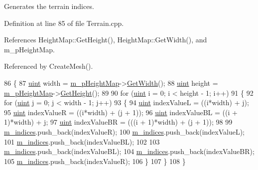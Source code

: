 Generates the terrain indices. 



Definition at line 85 of file Terrain.\+cpp.



References Height\+Map\+::\+Get\+Height(), Height\+Map\+::\+Get\+Width(), and m\+\_\+p\+Height\+Map.



Referenced by Create\+Mesh().


\begin{DoxyCode}
86 \{
87   \hyperlink{_types_8h_a4f5fce8c1ef282264f9214809524d836}{uint} width = \hyperlink{class_terrain_a1573c3a4a21afe306700bd00e7a9b4f5}{m\_pHeightMap}->\hyperlink{class_height_map_a85709e10bb08442730bfddb649a86e0b}{GetWidth}();
88   \hyperlink{_types_8h_a4f5fce8c1ef282264f9214809524d836}{uint} height = \hyperlink{class_terrain_a1573c3a4a21afe306700bd00e7a9b4f5}{m\_pHeightMap}->\hyperlink{class_height_map_a4c1243d24a8c5d039ea967a57a7bf462}{GetHeight}();
89 
90   \textcolor{keywordflow}{for} (\hyperlink{_types_8h_a4f5fce8c1ef282264f9214809524d836}{uint} i = 0; i < height - 1; i++)
91   \{
92     \textcolor{keywordflow}{for} (\hyperlink{_types_8h_a4f5fce8c1ef282264f9214809524d836}{uint} j = 0; j < width - 1; j++)
93     \{
94       \hyperlink{_types_8h_a4f5fce8c1ef282264f9214809524d836}{uint} indexValueL = ((i*width) + j);
95       \hyperlink{_types_8h_a4f5fce8c1ef282264f9214809524d836}{uint} indexValueR = ((i*width) + (j + 1));
96       \hyperlink{_types_8h_a4f5fce8c1ef282264f9214809524d836}{uint} indexValueBL = ((i + 1)*width) + j;
97       \hyperlink{_types_8h_a4f5fce8c1ef282264f9214809524d836}{uint} indexValueBR = (((i + 1)*width) + (j + 1));
98 
99       \hyperlink{class_terrain_a79132b320d28c77f4c7cb55b9f562631}{m\_indices}.push\_back(indexValueR);
100       \hyperlink{class_terrain_a79132b320d28c77f4c7cb55b9f562631}{m\_indices}.push\_back(indexValueL);
101       \hyperlink{class_terrain_a79132b320d28c77f4c7cb55b9f562631}{m\_indices}.push\_back(indexValueBL);
102 
103       \hyperlink{class_terrain_a79132b320d28c77f4c7cb55b9f562631}{m\_indices}.push\_back(indexValueBL);
104       \hyperlink{class_terrain_a79132b320d28c77f4c7cb55b9f562631}{m\_indices}.push\_back(indexValueBR);
105       \hyperlink{class_terrain_a79132b320d28c77f4c7cb55b9f562631}{m\_indices}.push\_back(indexValueR);
106     \}
107   \}
108 \}
\end{DoxyCode}



